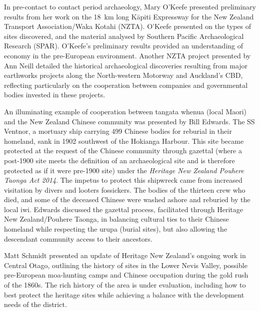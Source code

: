 
In pre-contact to contact period archaeology, Mary O’Keefe presented preliminary results from her work on the \SI{18}{\kilo\metre} long Kāpiti Expressway for the New Zealand Transport Association/Waka Kotahi (NZTA). O'Keefe presented on the types of sites discovered, and the material analysed by Southern Pacific Archaeological Research (SPAR). O'Keefe's preliminary results provided an understanding of economy in the pre-European environment. Another NZTA project presented by Ann Neill detailed the historical archaeological discoveries resulting from major earthworks projects along the North-western Motorway and Auckland’s CBD, reflecting particularly on the cooperation between companies and governmental bodies invested in these projects. 


An illuminating example of cooperation between tangata whenua (local Maori) and the New Zealand Chinese community was presented by Bill Edwards. The SS Ventnor, a mortuary ship carrying 499 Chinese bodies for reburial in their homeland, sank in 1902 southwest of the Hokianga Harbour. This site became protected at the request of the Chinese community through gazettal (where a post-1900 site meets the definition of an archaeological site and is therefore protected as if it were pre-1900 site) under the \emph{Heritage New Zealand Pouhere Taonga Act 2014}. The impetus to protect this shipwreck came from increased visitation by divers and looters fossickers. The bodies of the thirteen crew who died, and some of the deceased Chinese were washed ashore and reburied by the local iwi. Edwards discussed the gazettal process, facilitated through Heritage New Zealand/Pouhere Taonga, in balancing cultural ties to their Chinese homeland while respecting the urupa (burial sites), but also allowing the descendant community access to their ancestors.

Matt Schmidt presented an update of Heritage New Zealand’s ongoing work in Central Otago, outlining the history of sites in the Lower Nevis Valley, possible pre-European moa-hunting camps and Chinese occupation during the gold rush of the 1860s. The rich history of the area is under evaluation, including how to best protect the heritage sites while achieving a balance with the development needs of the district.

